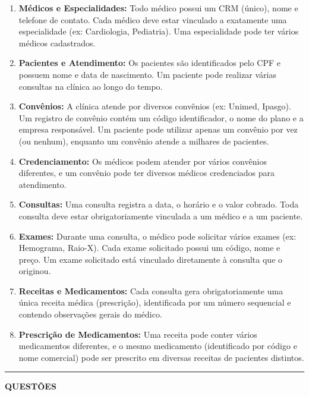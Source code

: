 \documentclass[12pt,a4paper]{article}
\begin{document}
\begin{enumerate}
    \item \textbf{Médicos e Especialidades:} Todo médico possui um CRM (único), nome e telefone de contato. Cada médico deve estar vinculado a exatamente uma especialidade (ex: Cardiologia, Pediatria). Uma especialidade pode ter vários médicos cadastrados.
    \item \textbf{Pacientes e Atendimento:} Os pacientes são identificados pelo CPF e possuem nome e data de nascimento. Um paciente pode realizar várias consultas na clínica ao longo do tempo.
    \item \textbf{Convênios:} A clínica atende por diversos convênios (ex: Unimed, Ipasgo). Um registro de convênio contém um código identificador, o nome do plano e a empresa responsável. Um paciente pode utilizar apenas um convênio por vez (ou nenhum), enquanto um convênio atende a milhares de pacientes. 
    \item \textbf{Credenciamento:} Os médicos podem atender por vários convênios diferentes, e um convênio pode ter diversos médicos credenciados para atendimento.
    \item \textbf{Consultas:} Uma consulta registra a data, o horário e o valor cobrado. Toda consulta deve estar obrigatoriamente vinculada a um médico e a um paciente.
    \item \textbf{Exames:} Durante uma consulta, o médico pode solicitar vários exames (ex: Hemograma, Raio-X). Cada exame solicitado possui um código, nome e preço. Um exame solicitado está vinculado diretamente à consulta que o originou.
    \item \textbf{Receitas e Medicamentos:} Cada consulta gera obrigatoriamente uma única receita médica (prescrição), identificada por um número sequencial e contendo observações gerais do médico.
    \item \textbf{Prescrição de Medicamentos:} Uma receita pode conter vários medicamentos diferentes, e o mesmo medicamento (identificado por código e nome comercial) pode ser prescrito em diversas receitas de pacientes distintos.
\end{enumerate}

\vspace{0.8cm}

\begin{center}
    \rule{\textwidth}{0.4pt}
    \textbf{QUESTÕES}
\end{center}
\end{document}

